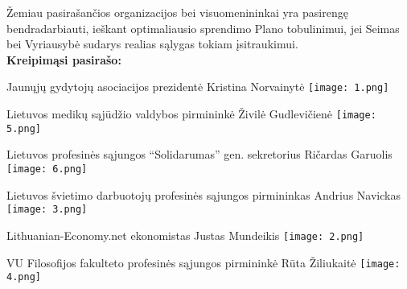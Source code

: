 \documentclass[12pt]{letter}
\begin{document}
Žemiau pasirašančios organizacijos bei visuomenininkai yra pasirengę bendradarbiauti, ieškant optimaliausio sprendimo Plano tobulinimui, jei Seimas bei Vyriausybė sudarys realias sąlygas tokiam įsitraukimui.\\

\textbf{Kreipimąsi pasirašo:}

Jaunųjų gydytojų asociacijos prezidentė Kristina Norvainytė                        
\texttt{[image: 1.png]}

Lietuvos medikų sąjūdžio valdybos pirmininkė Živilė Gudlevičienė 
\texttt{[image: 5.png]}

Lietuvos profesinės sąjungos “Solidarumas” gen. sekretorius Ričardas Garuolis
\texttt{[image: 6.png]}

Lietuvos švietimo darbuotojų profesinės sąjungos pirmininkas Andrius Navickas
\texttt{[image: 3.png]}

Lithuanian-Economy.net ekonomistas Justas Mundeikis
\texttt{[image: 2.png]}

VU Filosofijos fakulteto profesinės sąjungos pirmininkė Rūta Žiliukaitė
\texttt{[image: 4.png]}
\end{document}
